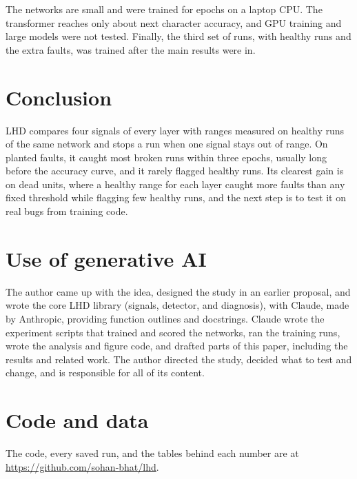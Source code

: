 \documentclass[11pt]{article}
\begin{document}
The networks are small and were trained for \lhdEpochRange{} epochs on a laptop CPU. The transformer reaches only about \lhdTransformerAcc{} next character accuracy, and GPU training and large models were not tested. Finally, the third set of runs, with \lhdFreshThirdSet{} healthy runs and the extra faults, was trained after the main results were in.

\section{Conclusion}
\label{sec:conclusion}

LHD compares four signals of every layer with ranges measured on healthy runs of the same network and stops a run when one signal stays out of range. On planted faults, it caught most broken runs within three epochs, usually long before the accuracy curve, and it rarely flagged healthy runs. Its clearest gain is on dead units, where a healthy range for each layer caught more faults than any fixed threshold while flagging few healthy runs, and the next step is to test it on real bugs from training code.

\FloatBarrier

\section*{Use of generative AI}

The author came up with the idea, designed the study in an earlier proposal, and wrote the core LHD library (signals, detector, and diagnosis), with Claude, made by Anthropic, providing function outlines and docstrings. Claude wrote the experiment scripts that trained and scored the networks, ran the training runs, wrote the analysis and figure code, and drafted parts of this paper, including the results and related work. The author directed the study, decided what to test and change, and is responsible for all of its content.

\section*{Code and data}

The code, every saved run, and the tables behind each number are at \url{https://github.com/sohan-bhat/lhd}.


\end{document}
